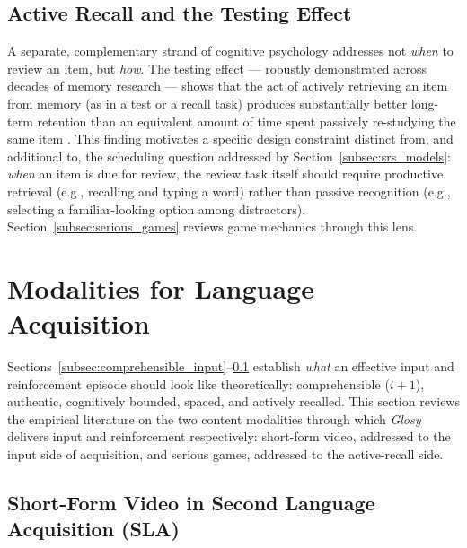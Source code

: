     \subsection{Active Recall and the Testing Effect}
    \label{subsec:testing_effect}
    A separate, complementary strand of cognitive psychology addresses not \emph{when} to review an item, but \emph{how}. The testing effect --- robustly demonstrated across decades of memory research --- shows that the act of actively retrieving an item from memory (as in a test or a recall task) produces substantially better long-term retention than an equivalent amount of time spent passively re-studying the same item \cite{roediger2006testing}. This finding motivates a specific design constraint distinct from, and additional to, the scheduling question addressed by Section~\ref{subsec:srs_models}: \emph{when} an item is due for review, the review task itself should require productive retrieval (e.g., recalling and typing a word) rather than passive recognition (e.g., selecting a familiar-looking option among distractors). Section~\ref{subsec:serious_games} reviews game mechanics through this lens.


\section{Modalities for Language Acquisition}
\label{sec:modalities}

    Sections~\ref{subsec:comprehensible_input}--\ref{subsec:testing_effect} establish \emph{what} an effective input and reinforcement episode should look like theoretically: comprehensible ($i+1$), authentic, cognitively bounded, spaced, and actively recalled. This section reviews the empirical literature on the two content modalities through which \textit{Glosy} delivers input and reinforcement respectively: short-form video, addressed to the input side of acquisition, and serious games, addressed to the active-recall side.

    \subsection{Short-Form Video in Second Language Acquisition (SLA)}
    \label{section:reels_in_sla}

